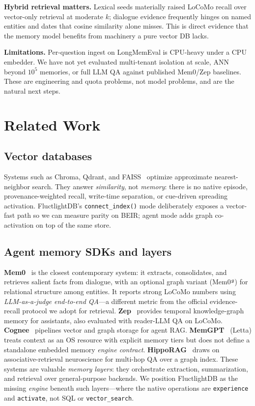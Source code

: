 \documentclass[11pt]{article}
\begin{document}
\textbf{Hybrid retrieval matters.} Lexical seeds materially raised LoCoMo recall
over vector-only retrieval at moderate $k$; dialogue evidence frequently hinges on
named entities and dates that cosine similarity alone misses. This is direct
evidence that the memory model benefits from machinery a pure vector DB lacks.

\textbf{Limitations.} Per-question ingest on LongMemEval is CPU-heavy under a CPU
embedder. We have not yet evaluated multi-tenant isolation at scale, ANN beyond
$10^5$ memories, or full LLM QA against published Mem0/Zep baselines. These are
engineering and quota problems, not model problems, and are the natural next steps.

\section{Related Work}
\subsection{Vector databases}
Systems such as Chroma, Qdrant, and FAISS~\cite{thakur2021beir} optimize approximate
nearest-neighbor search. They answer \emph{similarity}, not \emph{memory}: there is
no native episode, provenance-weighted recall, write-time separation, or
cue-driven spreading activation. FluctlightDB's \texttt{connect\_index()} mode
deliberately exposes a vector-fast path so we can measure parity on BEIR; agent
mode adds graph co-activation on top of the same store.

\subsection{Agent memory SDKs and layers}
\textbf{Mem0}~\cite{chhikara2025mem0} is the closest contemporary system: it
extracts, consolidates, and retrieves salient facts from dialogue, with an optional
graph variant (Mem0$^{\tiny g}$) for relational structure among entities. It
reports strong LoCoMo numbers using \emph{LLM-as-a-judge end-to-end QA}---a
different metric from the official evidence-recall protocol we adopt for retrieval.
\textbf{Zep}~\cite{zep2024} provides temporal knowledge-graph memory for
assistants, also evaluated with reader-LLM QA on LoCoMo. \textbf{Cognee}~\cite{cognee2024}
pipelines vector and graph storage for agent RAG. \textbf{MemGPT}~\cite{packer2023memgpt}
(Letta) treats context as an OS resource with explicit memory tiers but does not
define a standalone embedded memory \emph{engine contract}. \textbf{HippoRAG}~\cite{gutiérrez2024hipporag}
draws on associative-retrieval neuroscience for multi-hop QA over a graph index.
These systems are valuable \emph{memory layers}: they orchestrate extraction,
summarization, and retrieval over general-purpose backends. We position
FluctlightDB as the missing \emph{engine} beneath such layers---where the native
operations are \texttt{experience} and \texttt{activate}, not SQL or
\texttt{vector\_search}.
\end{document}
